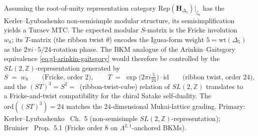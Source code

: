 \begin{remark}
\label{rem:gl-w8-modular}
Assuming the root-of-unity representation category
$\mathrm{Rep}(\mathbf{H}_{\Delta_5})|_{\zeta_8}$
has the Kerler--Lyubashenko non-semisimple modular structure, its
semisimplification yields a Turaev MTC. The expected modular $S$-matrix
is the Fricke involution~$w_8$;
its $T$-matrix (the ribbon twist $\theta$) encodes the
Igusa-form weight $5 = \mathrm{wt}(\Delta_5)$ as the
$2\pi i \cdot 5/24$-rotation phase.
The BKM analogue of the Arinkin--Gaitsgory equivalence
\eqref{eq:gl-arinkin-gaitsgory} would therefore be controlled by the
$SL(2,\mathbb{Z})$-representation
generated by
\begin{equation}
\label{eq:gl-st-generators}
 S \;=\; w_8
 \qquad\text{(Fricke, order $2$)},
 \qquad
 T \;=\; \exp\bigl(2\pi i \tfrac{5}{24}\bigr) \cdot \mathrm{id}
 \qquad\text{(ribbon twist, order~$24$)},
\end{equation}
and the $(ST)^3 = S^2 = $~(ribbon-twist-cube) relation of $SL(2,\mathbb{Z})$
translates to a Fricke-and-twist compatibility for the chiral Satake
self-duality. The $\mathrm{ord}((ST)^3) = 24$ matches the $24$-dimensional
Mukai-lattice grading. Primary:
Kerler--Lyubashenko~\cite{KerlerLyubashenko2001LMS262} Ch.~5
(non-semisimple $SL(2,\mathbb{Z})$-representation);
Bruinier~\cite{Bruinier2002Heegner} Prop.~5.1 (Fricke order $8$ on
$\Lambda^{2,1}$-anchored BKMs).
\end{remark}


